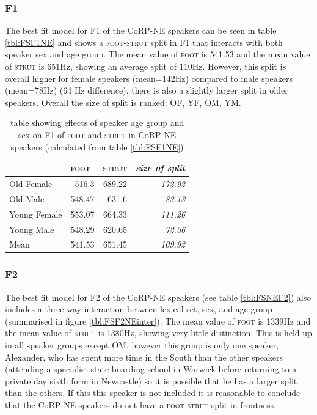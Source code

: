 \documentclass[12pt,a4paper,notitlepage,
bibliography=totoc,
numbers=endperiod,
appendixprefix=true,
usenames,dvipsnames]{scrartcl}
\let\Oldsubsubsection\subsubsection
\renewcommand{\subsubsection}{\FloatBarrier\Oldsubsubsection}
\newcommand{\scs}{\textsc}
\newcommand{\foot}{\scs{foot}}
\newcommand{\strutt}{\scs{strut}}
\newcommand{\FS}{\scs{foot}-\scs{strut}}
\newcommand{\todocontent}[1]{\todo[color=RoyalPurple]{#1}}
\begin{document}
\subsubsection{F1} \label{subsubsec:NEF1}

The best fit model for F1 of the CoRP-NE speakers can be seen in table \ref{tbl:FSF1NE} and shows a \FS{} split in F1 that interacts with both speaker sex and age group. The mean value of \foot{} is 541.53 and the mean value of \strutt{} is 651Hz, showing an average split of 110Hz. However, this split is overall higher for female speakers (mean=142Hz) compared to male speakers (mean=78Hz) (64 Hz difference), there is also a slightly larger split in older speakers. Overall the size of split is ranked: OF, YF, OM, YM. \todocontent{discuss}



\begin{table}[htbp]
	\centering
	\begin{tabular}{lrrr}
		\hline
		& \multicolumn{1}{l}{\foot{}} & \multicolumn{1}{l}{\strutt{}} & \multicolumn{1}{l}{\textit{size of split}} \\
		\hline
		Old Female & 516.3 & 689.22 & \textit{172.92} \\
		Old Male & 548.47 & 631.6 & \textit{83.13} \\
		Young Female & 553.07 & 664.33 & \textit{111.26} \\
		Young Male & 548.29 & 620.65 & \textit{72.36} \\
		Mean  & 541.53 & 651.45 & \textit{109.92} \\
		\hline
	\end{tabular}%
	\caption{table showing effects of speaker age group and sex on F1 of \foot{} and \strutt{} in CoRP-NE speakers (calculated from table \ref{tbl:FSF1NE})}
	\label{tbl:FSF1NEinter}%
\end{table}%

\begin{figure}[h]
	
	\caption{} \label{fig:FSF1NE}
\end{figure}


\subsubsection{F2} \label{subsubsec:NEF2}
The best fit model for F2 of the CoRP-NE speakers (see table \ref{tbl:FSNEF2}) also includes a three way interaction between lexical set, sex, and age group (summarised in figure \ref{tbl:FSF2NEinter}). The mean value of \foot{} is 1339Hz and the mean value of \strutt{} is 1380Hz, showing very little distinction. This is held up in all speaker groups except OM, however this group is only one speaker, Alexander, who has spent more time in the South than the other speakers (attending a specialist state boarding school in Warwick before returning to a private day sixth form in Newcastle) so it is possible that he has a larger split than the others. If this this speaker is not included it is reasonable to conclude that the CoRP-NE speakers do not have a \FS{} split in frontness.
\end{document}
